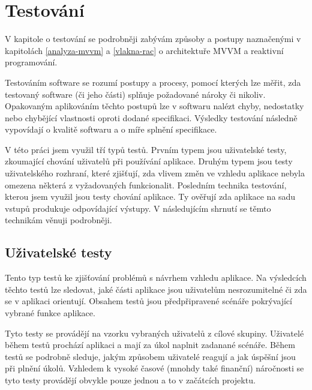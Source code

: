 \chapter{Testování}\label{testovani}



V kapitole o testování se podrobněji zabývám způsoby a postupy naznačenými v kapitolách \ref{analyza-mvvm} a \ref{vlakna-rac} o architektuře MVVM a reaktivní programování.

Testováním software se rozumí postupy a procesy, pomocí kterých lze měřit, zda testovaný software (či jeho části) splňuje požadované nároky či nikoliv.
Opakovaným aplikováním těchto postupů lze v softwaru nalézt chyby, nedostatky nebo chybějící vlastnosti oproti dodané specifikaci.
Výsledky testování následně vypovídají o kvalitě softwaru a o míře splnění specifikace. \cite{software-testing-definition}

V této práci jsem využil tří typů testů.
Prvním typem jsou uživatelské testy, zkoumající chování uživatelů při používání aplikace.
Druhým typem jsou testy uživatelského rozhraní, které zjišťují, zda vlivem změn ve vzhledu aplikace nebyla omezena některá z vyžadovaných funkcionalit.
Posledním technika testování, kterou jsem využil jsou testy chování aplikace.
Ty ověřují zda aplikace na sadu vstupů produkuje odpovídající výstupy.
V následujícím shrnutí se těmto technikám věnuji podrobněji.

\section{Uživatelské testy}\label{testovani-ux}

Tento typ testů ke zjišťování problémů s návrhem vzhledu aplikace.
Na výsledcích těchto testů lze sledovat, jaké části aplikace jsou uživatelům nesrozumitelné či zda se v aplikaci orientují.
Obsahem testů jsou předpřipravené scénáře pokrývající vybrané funkce aplikace. \cite{dobry-web-ux-testing}

Tyto testy se provádějí na vzorku vybraných uživatelů z cílové skupiny.
Uživatelé během testů prochází aplikaci a mají za úkol naplnit zadanané scénáře.
Během testů se podrobně sleduje, jakým způsobem uživatelé reagují a jak úspěšní jsou při plnění úkolů.
Vzhledem k vysoké časové (mnohdy také finanční) náročnosti se tyto testy provádějí obvykle pouze jednou a to v začátcích projektu. \cite{h1-ux-testing}

